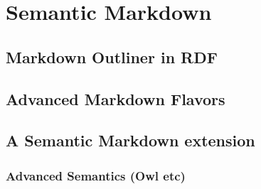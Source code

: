 \chapter{Semantic Markdown}

\section{Markdown Outliner in RDF}
\section{Advanced Markdown Flavors}
\section{A Semantic Markdown extension}
\subsection{Advanced Semantics (Owl etc)}